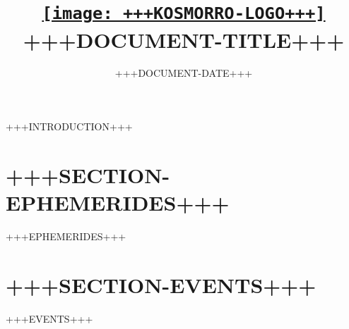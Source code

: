 \documentclass[a4paper,12pt]{article}
\title{\sffamily\href{http://kosmorro.space}{\texttt{[image: +++KOSMORRO-LOGO+++]}}\\+++DOCUMENT-TITLE+++}
\date{\vspace{-11mm}\sffamily +++DOCUMENT-DATE+++}
\begin{document}
    \maketitle

    +++INTRODUCTION+++


    \section{\sffamily +++SECTION-EPHEMERIDES+++}

    \begin{ephemerides}
+++EPHEMERIDES+++
    \end{ephemerides}

    \section{\sffamily +++SECTION-EVENTS+++}

    \begin{events}
        +++EVENTS+++
    \end{events}
\end{document}
